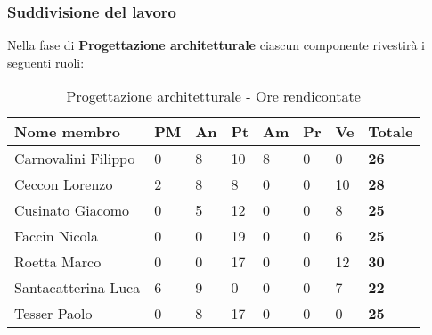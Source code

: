 		\subsubsection{Suddivisione del lavoro} %
		\label{ssub:suddivisione_del_lavoro}
		Nella fase di \textbf{Progettazione architetturale} ciascun componente rivestirà i seguenti ruoli: \\
			\begin{table}[!h]
				\begin{center}
					\begin{tabularx}{0.9\textwidth}{|l|l|l|l|l|l|l|X|}
						\hline
						\textbf{Nome membro} & \textbf{PM} & \textbf{An} & \textbf{Pt} & \textbf{Am} & \textbf{Pr} & \textbf{Ve} & \textbf{Totale} \\
						\hline
						Carnovalini Filippo & 0 & 8 & 10 & 8 & 0 & 0 & \textbf{26} \\
						\hline
						Ceccon Lorenzo & 2 & 8 & 8 & 0 & 0 & 10 & \textbf{28} \\
						\hline
						Cusinato Giacomo & 0 & 5 & 12 & 0 & 0 & 8 & \textbf{25} \\
						\hline
						Faccin Nicola & 0 & 0 & 19 & 0 & 0 & 6 & \textbf{25} \\
						\hline
						Roetta Marco & 0 & 0 & 17 & 0 & 0 & 12 & \textbf{30} \\
						\hline
						Santacatterina Luca & 6 & 9 & 0 & 0 & 0 & 7 & \textbf{22} \\
						\hline
						Tesser Paolo & 0 & 8 & 17 & 0 & 0 & 0 & \textbf{25} \\
						\hline	
					\end{tabularx}
				\end{center}
			\caption{Progettazione architetturale - Ore rendicontate}
			\end{table}

		
